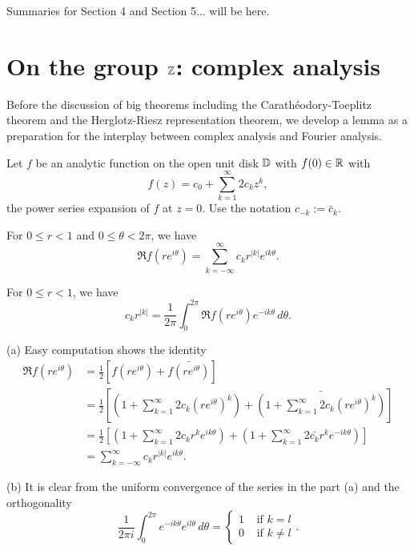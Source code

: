 \documentclass[12pt]{article}
\begin{document}
Summaries for Section 4 and Section 5... will be here.






\section{On the group $\mathbb{Z}$: complex analysis}

Before the discussion of big theorems including the Carath\'eodory-Toeplitz theorem and the Herglotz-Riesz representation theorem, we develop a lemma as a preparation for the interplay between complex analysis and Fourier analysis.

\begin{lem}
Let $f$ be an analytic function on the open unit disk $\mathbb{D}$ with $f(0)\in\mathbb{R}$ with
\[f(z)=c_0+\sum_{k=1}^\infty2c_kz^k,\]
the power series expansion of $f$ at $z=0$.
Use the notation $c_{-k}:=\bar c_k$.
\begin{parts}
\item For $0\le r<1$ and $0\le \theta<2\pi$, we have
\[\Re f(re^{i\theta})=\sum_{k=-\infty}^\infty c_kr^{|k|}e^{ik\theta}.\]
\item For $0\le r<1$, we have
\[c_kr^{|k|}=\frac1{2\pi}\int_0^{2\pi}\Re f(re^{i\theta})e^{-ik\theta}\,d\theta.\]
\end{parts}
\end{lem}
\begin{pf}
(a)
Easy computation shows the identity
\begin{align*}
\Re f(re^{i\theta})
&=\frac12[f(re^{i\theta})+\bar{f(re^{i\theta})}]\\
&=\frac12\left[\left(1+\sum_{k=1}^\infty2c_k(re^{i\theta})^k\right)+\bar{\left(1+\sum_{k=1}^\infty2c_k(re^{i\theta})^k\right)}\right]\\
&=\frac12\left[\left(1+\sum_{k=1}^\infty2c_kr^ke^{ik\theta}\right)+\left(1+\sum_{k=1}^\infty2\bar{c_k}r^ke^{-ik\theta}\right)\right]\\
&=\sum_{k=-\infty}^\infty c_kr^{|k|}e^{ik\theta}.
\end{align*}

(b)
It is clear from the uniform convergence of the series in the part (a) and the orthogonality
\[\frac1{2\pi i}\int_0^{2\pi}e^{-ik\theta}e^{il\theta}\,d\theta=\begin{cases}1&\text{ if }k=l\\0&\text{ if }k\ne l\end{cases}.\]
\end{pf}
\end{document}
